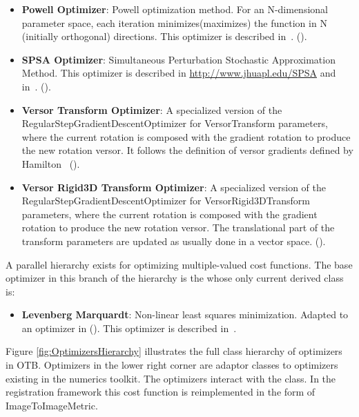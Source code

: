 \begin{itemize}
\item \textbf{Powell Optimizer}: Powell optimization method.  For an
N-dimensional parameter space, each iteration minimizes(maximizes) the function
in N (initially orthogonal) directions. This optimizer is described
in~\cite{Press1992}.  ().

\item \textbf{SPSA Optimizer}: Simultaneous Perturbation Stochastic
Approximation Method. This optimizer is described in
\url{http://www.jhuapl.edu/SPSA} and in~\cite{Spall1998}.
().

\item \textbf{Versor Transform Optimizer}: A specialized version of the
RegularStepGradientDescentOptimizer for VersorTransform
parameters, where the current rotation is composed with the gradient rotation
to produce the new rotation versor. It follows the definition of versor
gradients defined by Hamilton~\cite{Hamilton1866}
().

\item \textbf{Versor Rigid3D Transform Optimizer}: A specialized version of the
RegularStepGradientDescentOptimizer for VersorRigid3DTransform parameters,
where the current rotation is composed with the gradient rotation to produce
the new rotation versor. The translational part of the transform parameters are
updated as usually done in a vector space.
().


\end{itemize}

A parallel hierarchy exists for optimizing multiple-valued cost functions. The
base optimizer in this branch of the hierarchy is the
 whose only current derived class
is:

\begin{itemize}

\item \textbf{Levenberg Marquardt}: Non-linear least squares minimization.
Adapted to an optimizer in  ().
This optimizer is described in~\cite{Press1992}.

\end{itemize}


Figure \ref{fig:OptimizersHierarchy} illustrates the full class hierarchy of
optimizers in OTB. Optimizers in the lower right corner are adaptor classes
to optimizers existing in the  numerics toolkit. The optimizers
interact with the  class. In the registration framework
this cost function is reimplemented in the form of ImageToImageMetric.





